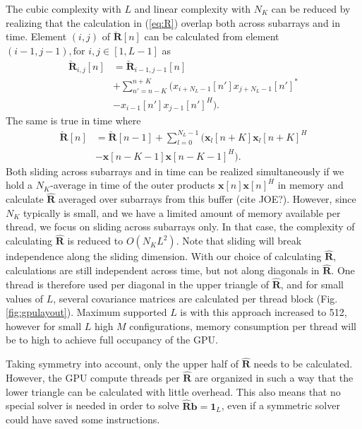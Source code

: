 \documentclass[12pt,journal,onecolumn]{IEEEtran}
\newcommand{\mat}[1]{\mathbf{#1}}
\renewcommand{\vec}[1]{\mathbf{#1}}
\begin{document}
The cubic complexity with $L$ and linear complexity with $N_K$ can be reduced by realizing that the calculation in (\ref{eq:R}) overlap both across subarrays and in time. Element $(i,j)$ of $\mat{\breve{R}}[n]$ can be calculated from element $(i-1, j-1), \text{for } i,j \in [1, L-1]$ as
\begin{align}
\mat{\breve{R}}_{i,j}[n] &=  \mat{\breve{R}}_{i-1,j-1}[n]  \nonumber \\
&+ \sum_{n'=n-K}^{n+K} (x_{i+N_L-1}[n']x_{j+N_L-1}[n']^* \nonumber \\
&- x_{i-1}[n']x_{j-1}[n']^H). \label{eq:sliding}
\end{align}
The same is true in time where
\begin{align}
\mat{\breve{R}}[n] &= \mat{\breve{R}}[n-1] + \sum_{l=0}^{N_L-1} (\vec{x}_l[n+K]\vec{x}_l[n+K]^H \nonumber \\
&- \vec{x}[n-K-1]\vec{x}[n-K-1]^H).
\end{align}
Both sliding across subarrays and in time can be realized simultaneously if we hold a $N_K$-average in time of the outer products $\vec{x}[n]\vec{x}[n]^H$ in memory and calculate $\mat{\hat{R}}$ averaged over subarrays from this buffer (cite JOE?). However, since $N_K$ typically is small, and we have a limited amount of memory available per thread, we focus on sliding across subarrays only. In that case, the complexity of calculating $\mat{\hat{R}}$ is reduced to $O(N_KL^2)$. Note that sliding will break independence along the sliding dimension. With our choice of calculating $\mat{\hat{R}}$, calculations are still independent across time, but not along diagonals in $\mat{\hat{R}}$. One thread is therefore used per diagonal in the upper triangle of $\mat{\hat{R}}$, and for small values of $L$, several covariance matrices are calculated per thread block (Fig. \ref{fig:gpulayout}). Maximum supported $L$ is with this approach increased to 512, however for small $L$ high $M$ configurations, memory consumption per thread will be to high to achieve full occupancy of the GPU.

Taking symmetry into account, only the upper half of $\mat{\hat{R}}$ needs to be calculated. However, the GPU compute threads per $\mat{\hat{R}}$ are organized in such a way that the lower triangle can be calculated with little overhead. This also means that no special solver is needed in order to solve $\mat{\hat{R}}\vec{b} = \vec{1}_L$, even if a symmetric solver could have saved some instructions.
\end{document}
